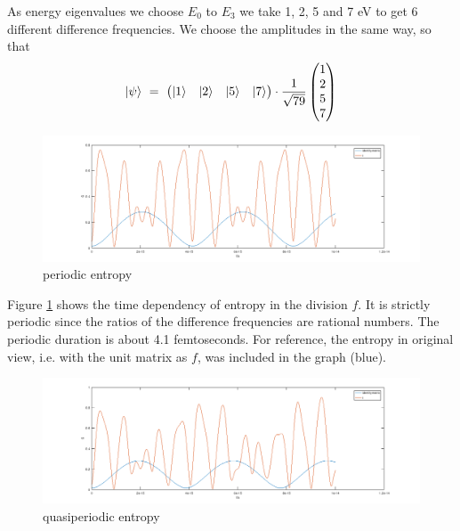 \documentclass[12pt]{article}
\begin{document}
As energy eigenvalues we choose $E_0$ to $E_3$ we take 1, 2, 5 and 7 eV to get 6 different difference frequencies. We choose the amplitudes in the same way, so that
\begin{equation*}
\ket{\psi}\ =\ \begin{pmatrix}
\ket{1} & \ket{2} & \ket{5} & \ket{7}
\end{pmatrix}
\cdot \frac{1}{\sqrt{79}}
\begin{pmatrix}
1 \\ 2 \\ 5 \\ 7
\end{pmatrix}
\end{equation*}
\begin{figure}[!h]\begin{center}
  \includegraphics[width=19cm]{periodic_entropy.png}
  \caption{periodic entropy}
  \label{fig:periodic_entropy}
\end{center}\end{figure}

Figure \ref{fig:periodic_entropy} shows the time dependency of entropy in the division $f$. It is strictly periodic since the ratios of the difference frequencies are rational numbers. The periodic duration is about 4.1 femtoseconds.
For reference, the entropy in original view, i.e. with the unit matrix as $f$, was included in the graph (blue).
\begin{figure}[!h]\begin{center}
  \includegraphics[width=19cm]{quasi_periodic_entropy.png}
  \caption{quasiperiodic entropy}
  \label{fig:quasi_periodic_entropy}
\end{center}\end{figure}
\end{document}
